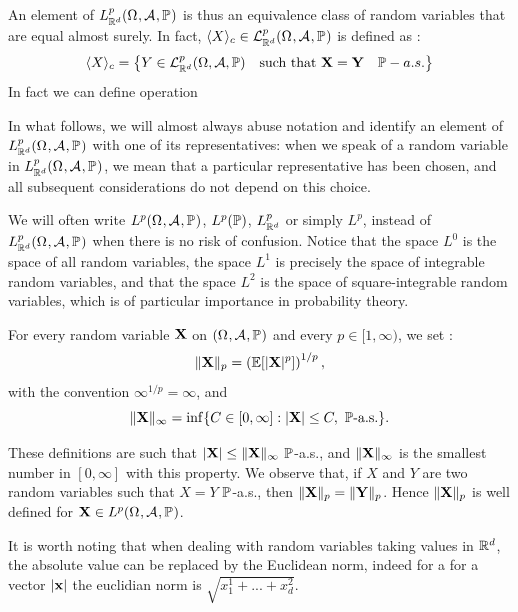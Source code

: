 \documentclass[../Main.tex]{subfiles}
\begin{document}
An element of $L^p_{\mathbb{R}^d}(\Omega_{}, \mathcal{A}_{}, \mathbb{P}_{})$ is thus an equivalence class of random variables that are equal almost surely. In fact, $\langle X \rangle_c\in\mathcal{L}^p_{\mathbb{R}^d}(\Omega_{}, \mathcal{A}_{}, \mathbb{P}_{})$ is defined as : 
\[ \langle X \rangle_c = \left\{ Y \in \mathcal{L}^p_{\mathbb{R}^d}(\Omega,\mathcal{A},\mathbb{P})\quad \text{such that } \mathbf{X} = \mathbf{Y} \quad \mathbb{P}-a.s. \right\}\] 
In fact we can define operation 


In what follows, we will almost always abuse notation and identify an element of $L^p_{\mathbb{R}^d}(\Omega_{}, \mathcal{A}_{}, \mathbb{P}_{})$ with one of its representatives: when we speak of a random variable in $L^p_{\mathbb{R}^d}(\Omega_{}, \mathcal{A}_{}, \mathbb{P}_{})$, we mean that a particular representative has been chosen, and all subsequent considerations do not depend on this choice.

We will often write $L^p(\Omega_{}, \mathcal{A}_{}, \mathbb{P}_{})$, $L^p(\mathbb{P})$, $L^p_{\mathbb{R}^d}$ or simply $L^p$, instead of $L^p_{\mathbb{R}^d}(\Omega_{}, \mathcal{A}_{}, \mathbb{P}_{})$ when there is no risk of confusion. Notice that the space $L^0$ is the space of all random variables, the space $L^1$ is precisely the space of integrable random variables, and that the space $L^2$ is the space of square-integrable random variables, which is of particular importance in probability theory.

For every random variable $\mathbf{X}$ on $(\Omega_{}, \mathcal{A}_{}, \mathbb{P}_{})$ and every $p\in[1,\infty)$, we set : 
\[ \|\mathbf{X}\|_p = \left(\mathbb{E}\!\left[|\mathbf{X}|^p\right]\right)^{1/p}, \]
with the convention $\infty^{1/p}=\infty$, and
\[ \|\mathbf{X}\|_\infty = \inf\{C\in[0,\infty] : |\mathbf{X}|\le C,\ \mathbb{P}\text{-a.s.}\}. \]

These definitions are such that $|\mathbf{X}|\le\|\mathbf{X}\|_\infty$ $\mathbb{P}$-a.s., and $\|\mathbf{X}\|_\infty$ is the smallest number in $[0,\infty]$ with this property. We observe that, if $X$ and $Y$ are two random variables such that $X=Y$ $\mathbb{P}$-a.s., then $\|\mathbf{X}\|_p=\|\mathbf{Y}\|_p$. Hence $\|\mathbf{X}\|_p$ is well defined for $\mathbf{X}\in L^p(\Omega_{}, \mathcal{A}_{}, \mathbb{P}_{})$.

It is worth noting that when dealing with random variables taking values in $\mathbb{R}^d$, the absolute value can be replaced by the Euclidean norm, indeed for a for a vector  $|\mathbf{x}|$ the euclidian norm is $\sqrt{x_1^1+...+x_d^2}$.
\end{document}

